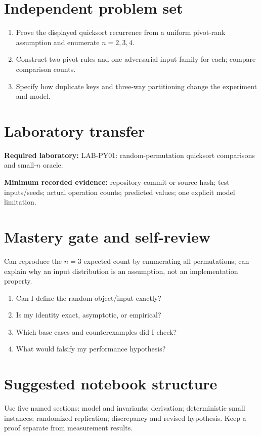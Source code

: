 \documentclass[11pt]{article}
\begin{document}
\section{Independent problem set}
\begin{enumerate}
\item Prove the displayed quicksort recurrence from a uniform pivot-rank assumption and enumerate $n=2,3,4$.
\item Construct two pivot rules and one adversarial input family for each; compare comparison counts.
\item Specify how duplicate keys and three-way partitioning change the experiment and model.
\end{enumerate}
\section{Laboratory transfer}
\textbf{Required laboratory:} LAB-PY01: random-permutation quicksort comparisons and small-$n$ oracle.\par
\noindent\textbf{Minimum recorded evidence:} repository commit or source hash; test inputs/seeds; actual operation counts; predicted values; one explicit model limitation.\par
\section{Mastery gate and self-review}
Can reproduce the $n=3$ expected count by enumerating all permutations; can explain why an input distribution is an assumption, not an implementation property.\par
\begin{enumerate}\item Can I define the random object/input exactly? \item Is my identity exact, asymptotic, or empirical? \item Which base cases and counterexamples did I check? \item What would falsify my performance hypothesis?\end{enumerate}
\section{Suggested notebook structure}
Use five named sections: model and invariants; derivation; deterministic small instances; randomized replication; discrepancy and revised hypothesis. Keep a proof separate from measurement results.
\end{document}
